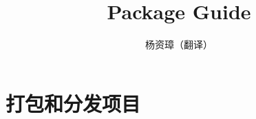 \documentclass{ctexart}
\title{Package Guide}
\author{杨资璋（翻译）}
\begin{document}
\maketitle
\section{打包和分发项目}

\end{document}
